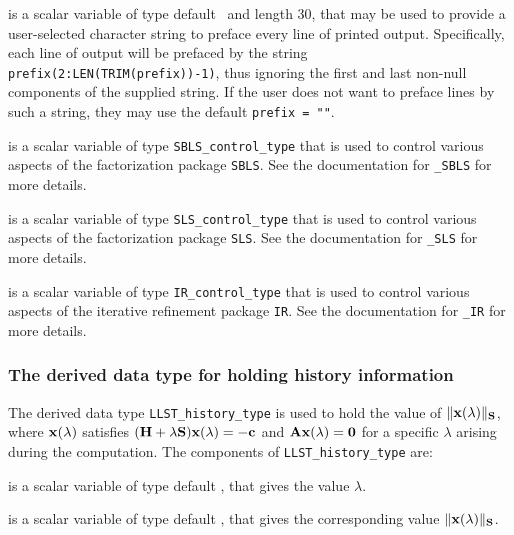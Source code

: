 \documentclass{galahad}
\newcommand{\packagename}{LLST}
\begin{document}
\begin{description}
 is a scalar variable of type default \character\
and length 30, that may be used to provide a user-selected 
character string to preface every line of printed output. 
Specifically, each line of output will be prefaced by the string 
{\tt prefix(2:LEN(TRIM(prefix))-1)},
thus ignoring the first and last non-null components of the
supplied string. If the user does not want to preface lines by such
a string, they may use the default {\tt prefix = ""}.

 is a scalar variable of type 
{\tt SBLS\_control\_type} that is used to control various aspects of the
factorization package {\tt SBLS}. See the documentation for 
{\tt \libraryname\_SBLS} for more details.

 is a scalar variable of type 
{\tt SLS\_control\_type} that is used to control various aspects of the
factorization package {\tt SLS}. See the documentation for 
{\tt \libraryname\_SLS} for more details.

 is a scalar variable of type 
{\tt IR\_control\_type} that is used to control various aspects of the
iterative refinement package {\tt IR}. See the documentation for 
{\tt \libraryname\_IR} for more details.

\end{description}


\subsubsection{The derived data type for holding history
 information}\label{typehist}
The derived data type 
{\tt \packagename\_history\_type} 
is used to hold the value of $\|{\mathbf{x}}(\lambda)\|_{{\mathbf{S}}}$, where
${\mathbf{x}}(\lambda)$ satisfies
$({\mathbf{H}} + \lambda {\mathbf{S}}){\mathbf{x}}(\lambda) = - {\mathbf{c}}$ and ${\mathbf{A}}{\mathbf{x}}(\lambda) = {\mathbf{0}}$
for a specific $\lambda$ arising during the computation.
The components of 
{\tt \packagename\_history\_type} 
are:
\begin{description}
 is a scalar variable of type default \realdp, that gives
 the value $\lambda$.

 is a scalar variable of type default \real, that gives
 the corresponding value $\|{\mathbf{x}}(\lambda)\|_{{\mathbf{S}}}$.

\end{description}

\end{document}
